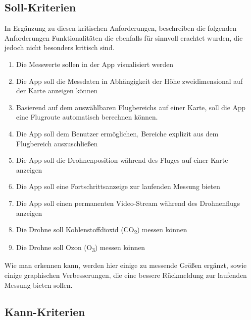 \subsection{Soll-Kriterien}\label{subsec:SollKrit}
In Ergänzung zu diesen kritischen Anforderungen, beschreiben die folgenden Anforderungen Funktionalitäten die ebenfalls für sinnvoll erachtet wurden, die jedoch nicht besonders kritisch sind.
\newline
\begin{enumerate}[label=\roman*.]
	\item Die Messwerte sollen in der App visualisiert werden 	
	\item Die App soll die Messdaten in Abhängigkeit der Höhe zweidimensional auf der Karte anzeigen können
	\item Basierend auf dem auswählbaren Flugbereichs auf einer Karte, soll die App eine Flugroute automatisch berechnen können.
	\item Die App soll dem Benutzer ermöglichen, Bereiche explizit aus dem Flugbereich auszuschließen
	\item Die App soll die Drohnenposition während des Fluges auf einer Karte anzeigen
	\item Die App soll eine Fortschrittsanzeige zur laufenden Messung bieten
	\item Die App soll einen permanenten Video-Stream während des Drohnenflugs anzeigen
	\item Die Drohne soll Kohlenstoffdioxid (CO\textsubscript{2}) messen können
	\item Die Drohne soll Ozon (O\textsubscript{3}) messen können	
\end{enumerate}
Wie man erkennen kann, werden hier einige zu messende Größen ergänzt, sowie einige graphischen Verbesserungen, die eine bessere Rückmeldung zur laufenden Messung bieten sollen.
\subsection{Kann-Kriterien}\label{subsec:KannKrit}
